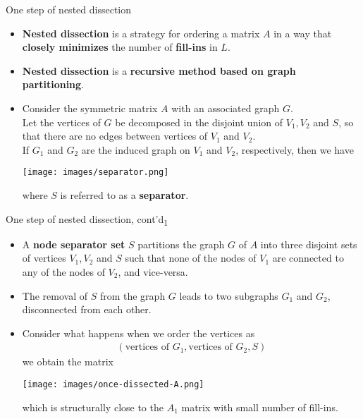 \documentclass[t,usepdftitle=false]{beamer}
\begin{document}
\begin{frame}{One step of nested dissection}
\begin{itemize}
\item \textbf{Nested dissection} is a strategy for ordering a matrix $A$ in a way that \textbf{closely minimizes} the number of \textbf{fill-ins} in $L$.
\item \textbf{Nested dissection} is a \textbf{recursive method based on graph partitioning}.
\item Consider the symmetric matrix $A$ with an associated graph $G$.\vspace{.1cm}\\
Let the vertices of $G$ be decomposed in the disjoint union of $V_1,V_2$ and $S$, so that there are no edges between vertices of $V_1$ and $V_2$.\vspace{.1cm}\\
If $G_1$ and $G_2$ are the induced graph on $V_1$ and $V_2$, respectively, then we have
\begin{center}
\vspace{0cm}
\texttt{[image: images/separator.png]}
\end{center}
where $S$ is referred to as a \textbf{separator}.
\end{itemize}
\end{frame}

\begin{frame}{One step of nested dissection, cont'd\textsubscript{1}}
\begin{itemize}
\item A \textbf{node separator set} $S$ partitions the graph $G$ of $A$ into three disjoint sets of vertices $V_1,V_2$ and $S$ such that none of the nodes of $V_1$ are connected to any of the nodes of $V_2$, and vice-versa.
\item The removal of $S$ from the graph $G$ leads to two subgraphs $G_1$ and $G_2$, disconnected from each other. 
\item Consider what happens when we order the vertices as 
\begin{align*}
(\text{vertices of }G_1,\text{vertices of }G_2, S)
\end{align*}
we obtain the matrix
\begin{center}
\vspace{0cm}
\texttt{[image: images/once-dissected-A.png]}
\end{center}
which is structurally close to the $A_1$ matrix with small number of fill-ins.
\end{itemize}
\end{frame}
\end{document}
